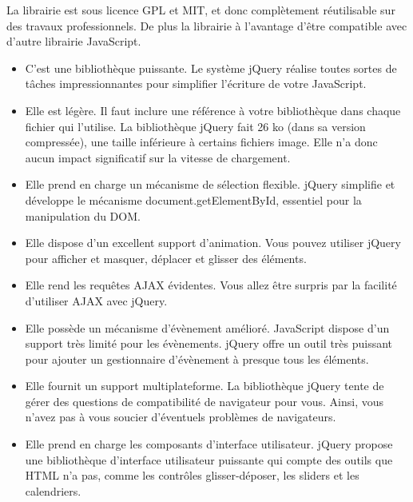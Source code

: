 La librairie est sous licence GPL et MIT, et donc complètement réutilisable sur des travaux professionnels. De plus la librairie à l’avantage d’être compatible avec d’autre librairie JavaScript. 

\begin{itemize}
  \item[\textbullet]
  C'est une bibliothèque puissante. Le système jQuery réalise toutes sortes de tâches impressionnantes pour simplifier l'écriture de votre JavaScript.
  
  \item[\textbullet]
  Elle est légère. Il faut inclure une référence à votre bibliothèque dans chaque fichier qui l'utilise. La bibliothèque jQuery fait 26 ko (dans sa version compressée), une taille inférieure à certains fichiers image. Elle n'a donc aucun impact significatif sur la vitesse de chargement.
  
  \item[\textbullet]
  Elle prend en charge un mécanisme de sélection flexible. jQuery simplifie et développe le mécanisme document.getElementById, essentiel pour la manipulation du DOM.
  
    \item[\textbullet]
    Elle dispose d'un excellent support d'animation. Vous pouvez utiliser jQuery pour afficher et masquer, déplacer et glisser des éléments.
    
    \item[\textbullet]
    Elle rend les requêtes AJAX évidentes. Vous allez être surpris par la facilité d'utiliser AJAX avec jQuery.
      
    \item[\textbullet]
    Elle possède un mécanisme d'évènement amélioré. JavaScript dispose d'un support très limité pour les évènements. jQuery offre un outil très puissant pour ajouter un gestionnaire d'évènement à presque tous les éléments.
    
    \item[\textbullet]
    Elle fournit un support multiplateforme. La bibliothèque jQuery tente de gérer des questions de compatibilité de navigateur pour vous. Ainsi, vous n'avez pas à vous soucier d'éventuels problèmes de navigateurs.
    
    \item[\textbullet]
    Elle prend en charge les composants d'interface utilisateur. jQuery propose une bibliothèque d'interface utilisateur puissante qui compte des outils que HTML n'a pas, comme les contrôles glisser-déposer, les sliders et les calendriers.


\end{itemize}
